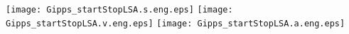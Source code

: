 \documentclass[a4paper,12pt]{article}
\begin{document}

\begin{center}
\texttt{[image: Gipps\_startStopLSA.s.eng.eps]} 
\texttt{[image: Gipps\_startStopLSA.v.eng.eps]}
\texttt{[image: Gipps\_startStopLSA.a.eng.eps]}
\end{center}

\end{document}

